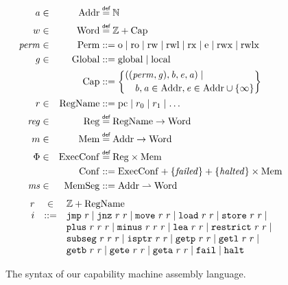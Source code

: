 \documentclass[compsoc,conference,letterpaper,fleqn]{IEEEtran}
\newcommand{\parfun}{\rightharpoonup}
\newcommand{\var}[1]{\mathit{#1}}
\newcommand{\hs}{\var{ms}}
\newcommand{\ms}{\hs}
\newcommand{\hv}{\var{r}}
\newcommand{\rv}{\var{r}}
\newcommand{\lv}{\var{r}}
\newcommand{\gl}{\var{g}}
\newcommand{\pcreg}{\mathrm{pc}}
\newcommand{\addr}{\var{a}}
\newcommand{\start}{\var{b}}
\newcommand{\addrend}{\var{e}}
\newcommand{\reg}{\var{reg}}
\newcommand{\perm}{\var{perm}}
\newcommand{\failed}{\mathit{failed}}
\newcommand{\halted}{\mathit{halted}}
\newcommand{\plaindom}[1]{\mathrm{#1}}
\newcommand{\Caps}{\plaindom{Cap}}
\newcommand{\Words}{\plaindom{Word}}
\newcommand{\Addrs}{\plaindom{Addr}}
\newcommand{\ExecConfs}{\plaindom{ExecConf}}
\newcommand{\RegName}{\plaindom{RegName}}
\newcommand{\Regs}{\plaindom{Reg}}
\newcommand{\Heaps}{\plaindom{Mem}}
\newcommand{\HeapSegments}{\plaindom{MemSeg}}
\newcommand{\MemSegments}{\HeapSegments}
\newcommand{\Confs}{\plaindom{Conf}}
\newcommand{\nats}{\mathbb{N}}
\newcommand{\ints}{\mathbb{Z}}
\newcommand{\Perms}{\plaindom{Perm}}
\newcommand{\Globals}{\plaindom{Global}}
\newcommand{\zinstr}[1]{\mathtt{#1}}
\newcommand{\fail}{\zinstr{fail}}
\newcommand{\halt}{\zinstr{halt}}
\newcommand{\oneinstr}[2]{
  \ifthenelse{\equal{#2}{}}
  {\zinstr{#1}}
  {\zinstr{#1} \; #2}
}
\newcommand{\jmp}[1]{\oneinstr{jmp}{#1}}
\newcommand{\twoinstr}[3]{
  \ifthenelse{\equal{#2#3}{}}
  {\zinstr{#1}}
  {\zinstr{#1} \; #2 \; #3}
}
\newcommand{\restricttwo}[2]{\twoinstr{restrict}{#1}{#2}}
\newcommand{\jnz}[2]{\twoinstr{jnz}{#1}{#2}}
\newcommand{\isptr}[2]{\twoinstr{isptr}{#1}{#2}}
\newcommand{\geta}[2]{\twoinstr{geta}{#1}{#2}}
\newcommand{\getb}[2]{\twoinstr{getb}{#1}{#2}}
\newcommand{\gete}[2]{\twoinstr{gete}{#1}{#2}}
\newcommand{\getp}[2]{\twoinstr{getp}{#1}{#2}}
\newcommand{\getl}[2]{\twoinstr{getl}{#1}{#2}}
\newcommand{\move}[2]{\twoinstr{move}{#1}{#2}}
\newcommand{\store}[2]{\twoinstr{store}{#1}{#2}}
\newcommand{\load}[2]{\twoinstr{load}{#1}{#2}}
\newcommand{\lea}[2]{\twoinstr{lea}{#1}{#2}}
\newcommand{\threeinstr}[4]{
  \ifthenelse{\equal{#2#3#4}{}}
  {\zinstr{#1}}
  {\zinstr{#1} \; #2 \; #3 \; #4}
}
\newcommand{\subseg}[3]{\threeinstr{subseg}{#1}{#2}{#3}}
\newcommand{\plus}[3]{\threeinstr{plus}{#1}{#2}{#3}}
\newcommand{\minus}[3]{\threeinstr{minus}{#1}{#2}{#3}}
\newcommand{\plainperm}[1]{\mathrm{#1}}
\newcommand{\noperm}{\plainperm{o}}
\newcommand{\readonly}{\plainperm{ro}}
\newcommand{\readwrite}{\plainperm{rw}}
\newcommand{\exec}{\plainperm{rx}}
\newcommand{\entry}{\plainperm{e}}
\newcommand{\rwx}{\plainperm{rwx}}
\newcommand{\readwritel}{\plainperm{rwl}}
\newcommand{\rwlx}{\plainperm{rwlx}}
\newcommand{\local}{\plainperm{local}}
\newcommand{\glob}{\plainperm{global}}
\newcommand{\isdef}{\mathrel{\overset{\makebox[0pt]{\mbox{\normalfont\tiny\sffamily def}}}{=}}}
\newcommand\bnfdef{\mathrel{::=}}
\begin{document}
\begin{figure}
  \begin{align*}
    \addr   &\in& \Addrs &\isdef \nats\\
    w &\in&\Words &\isdef \ints + \Caps \\
    \perm   &\in& \Perms &::= \noperm \mid \readonly\mid \readwrite\mid \readwritel\mid \exec\mid \entry\mid \rwx\mid \rwlx\\
    \gl&\in&\Globals & ::= \glob \mid \local \\
     && \Caps  &::= \left\{
                       \begin{multlined}
                         ((\perm,\gl),\start,\addrend,\addr)\mid\\
                         \start,\addr\in\Addrs,\addrend \in
                         \Addrs\cup \{\infty\}
                       \end{multlined} \right\}\\
    r       &\in& \RegName&\bnfdef \pcreg\mid r_0\mid r_1\mid\ldots\\
    \reg &\in& \Regs  &\isdef \RegName \rightarrow \Words\\
    m&\in& \Heaps &\isdef \Addrs \rightarrow \Words \\
    \Phi    &\in& \ExecConfs  &\isdef \Regs \times \Heaps \\
    &&\Confs &::= \ExecConfs + \{\failed \} + \{\halted\} \times \Heaps \\
    \ms     &\in& \MemSegments &::= \Addrs \parfun \Words
  \end{align*}
  \begin{equation*}
  \begin{array}{rcl}
    \rv    &\in& \ints + \RegName \\
    i      &::=& 
                 \jmp{\lv} \mid 
                 \jnz{\lv}{\rv} \mid
                 \move{\lv}{\rv} \mid 
                 \load{\lv}{\hv} \mid 
                 \store{\hv}{\rv} \mid  \\
           &   & \plus{\lv}{\rv}{\rv} \mid 
                 \minus{\lv}{\rv}{\rv} \mid 
                 \lea{\lv}{\rv} \mid 
                 \restricttwo{\lv}{\rv} \mid \\
           &   & \subseg{\lv}{\rv}{\rv} \mid  
                 \isptr{\lv}{\rv} \mid 
                 \getp{\lv}{\lv} \mid 
                 \getl{\lv}{\lv} \mid\\ 
           &   & \getb{\lv}{\lv} \mid
                 \gete{\lv}{\lv} \mid
                 \geta{\lv}{\lv} \mid 
                 \fail \mid
                 \halt 
  \end{array}
\end{equation*}
  \caption{The syntax of our capability machine assembly language.}
  \label{fig:syntax}
\end{figure}
\end{document}
